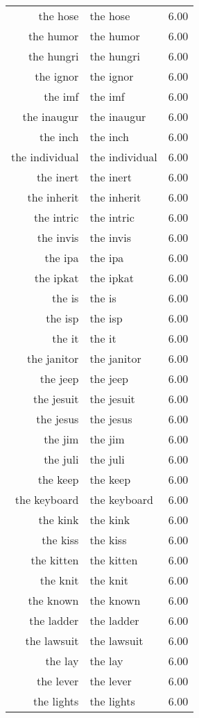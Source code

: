 \begin{table}[ht]
\begin{tabular}{rlr}
  the hose & the hose & 6.00 \\ 
  the humor & the humor & 6.00 \\ 
  the hungri & the hungri & 6.00 \\ 
  the ignor & the ignor & 6.00 \\ 
  the imf & the imf & 6.00 \\ 
  the inaugur & the inaugur & 6.00 \\ 
  the inch & the inch & 6.00 \\ 
  the individual & the individual & 6.00 \\ 
  the inert & the inert & 6.00 \\ 
  the inherit & the inherit & 6.00 \\ 
  the intric & the intric & 6.00 \\ 
  the invis & the invis & 6.00 \\ 
  the ipa & the ipa & 6.00 \\ 
  the ipkat & the ipkat & 6.00 \\ 
  the is & the is & 6.00 \\ 
  the isp & the isp & 6.00 \\ 
  the it & the it & 6.00 \\ 
  the janitor & the janitor & 6.00 \\ 
  the jeep & the jeep & 6.00 \\ 
  the jesuit & the jesuit & 6.00 \\ 
  the jesus & the jesus & 6.00 \\ 
  the jim & the jim & 6.00 \\ 
  the juli & the juli & 6.00 \\ 
  the keep & the keep & 6.00 \\ 
  the keyboard & the keyboard & 6.00 \\ 
  the kink & the kink & 6.00 \\ 
  the kiss & the kiss & 6.00 \\ 
  the kitten & the kitten & 6.00 \\ 
  the knit & the knit & 6.00 \\ 
  the known & the known & 6.00 \\ 
  the ladder & the ladder & 6.00 \\ 
  the lawsuit & the lawsuit & 6.00 \\ 
  the lay & the lay & 6.00 \\ 
  the lever & the lever & 6.00 \\ 
  the lights & the lights & 6.00 \\ 

\end{tabular}
\end{table}
